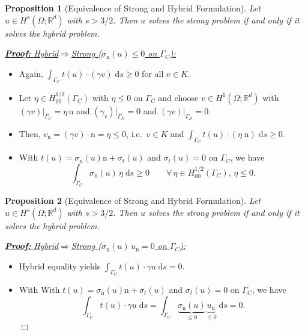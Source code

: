 \documentclass[10pt,aspectratio=169]{beamer}
\newtheorem{proposition}{Proposition}[section]
\def\R{{\mathbb R}}
\def\d{{\mathrm{d}}}
\def\ds{{\d s}}
\def\eop{\hfill{$\Box$}}
\begin{document}
\begin{frame}
	\begin{proposition}[Equivalence of Strong and Hybrid Formulation]
		Let $u\in H^s(\Omega;\R^d)$ with $s>3/2$. Then $u$ solves the strong problem if and only if it solves the hybrid problem.
	\end{proposition}
	\underline{\textbf{\em Proof:} {\em Hybrid\enspace}$\Longrightarrow${\em\enspace Strong ($\sigma_\mathrm{n}(u)\le 0$ on $\Gamma_C$):}}
	\begin{itemize}
		\item Again, $\displaystyle \int_{\Gamma_C} t(u)\cdot (\gamma v)\;\ds \ge 0$ for all $v\in K$.
		\item Let $\eta\in H_{00}^{1/2}(\Gamma_C)$ with $\eta\le 0$ on $\Gamma_C$ and choose $v\in H^1(\Omega;\R^d)$ with $(\gamma v)|_{\Gamma_C} = \eta\,\mathrm{n}$ and $(\gamma_v)|_{\Gamma_N} = 0$ and $(\gamma v)|_{\Gamma_D} = 0$.
		\item Then, $v_\mathrm{n} = (\gamma v)\cdot\mathrm{n} = \eta\le 0$, i.e.\ $v\in K$ and $\displaystyle \int_{\Gamma_C}t(u)\cdot(\eta\;\mathrm{n})\;\ds\ge 0$.
		\item With $t(u)=\sigma_\mathrm{n}(u)\mathrm{n}+\sigma_t(u)$ and $\sigma_t(u) = 0$ on $\Gamma_C$, we have
		      \begin{equation*}
			      \int_{\Gamma_C}\sigma_\mathrm{n}(u)\,\eta\;\ds \ge 0\qquad \forall\,\eta\in H_{00}^{1/2}(\Gamma_C),\, \eta \le 0.
		      \end{equation*}
	\end{itemize}
\end{frame}

\begin{frame}
	\begin{proposition}[Equivalence of Strong and Hybrid Formulation]
		Let $u\in H^s(\Omega;\R^d)$ with $s>3/2$. Then $u$ solves the strong problem if and only if it solves the hybrid problem.
	\end{proposition}
	\underline{\textbf{\em Proof:} {\em Hybrid\enspace}$\Longrightarrow${\em\enspace Strong ($\sigma_\mathrm{n}(u)\,u_\mathrm{n} = 0$ on $\Gamma_C$):}}
	\begin{itemize}
		\item Hybrid equality yields $\displaystyle \int_{\Gamma_C} t(u)\cdot\gamma u\;\ds = 0$.
		\item With With $t(u)=\sigma_\mathrm{n}(u)\mathrm{n}+\sigma_t(u)$ and $\sigma_t(u) = 0$ on $\Gamma_C$, we have
		      \begin{equation*}
			      \int_{\Gamma_C} t(u)\cdot\gamma u\;\ds  = \int_{\Gamma_C} \underbrace{\sigma_\mathrm{n}(u)}_{\le 0}\underbrace{u_\mathrm{n}}_{\le 0}\;\ds = 0.
		      \end{equation*}\eop
	\end{itemize}
\end{frame}
\end{document}
